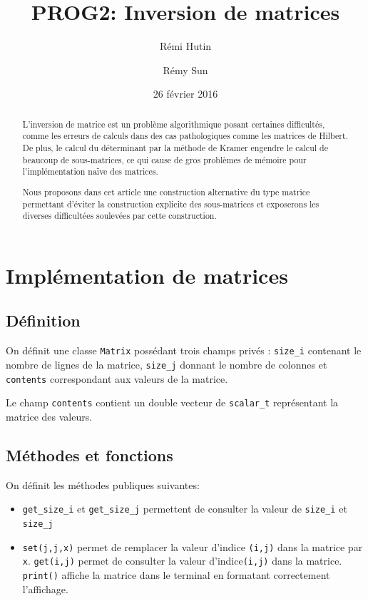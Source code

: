 \documentclass[a4paper,11pt]{article}
\title{PROG2: Inversion de matrices}
\author{Rémi Hutin \and Rémy Sun}
\date{26 février 2016}
\begin{document}
\maketitle

\begin{abstract}
  L'inversion de matrice est un problème algorithmique posant certaines difficultés, comme les erreurs de calculs dans des cas pathologiques comme les matrices de Hilbert.
  De plus, le calcul du déterminant par la méthode de Kramer engendre le calcul de beaucoup de sous-matrices, ce qui cause de gros problèmes de mémoire pour l'implémentation naïve des matrices.

  Nous proposons dans cet article une construction alternative du type matrice permettant d'éviter la construction explicite des sous-matrices et exposerons les diverses difficultées soulevées par cette construction.
\end{abstract}

\section{Implémentation de matrices}

\subsection{Définition}

On définit une classe \texttt{Matrix} possédant trois champs privés : \texttt{size\_i} contenant le nombre de lignes de la matrice, \texttt{size\_j} donnant le nombre de colonnes et
 \texttt{contents} correspondant aux valeurs de la matrice.

Le champ  \texttt{contents}  contient un double vecteur de \texttt{scalar\_t} représentant la matrice des valeurs.

\subsection{Méthodes et fonctions}

On définit les méthodes publiques suivantes:

\begin{itemize}
\item \texttt{get\_size\_i} et \texttt{get\_size\_j} permettent de consulter la valeur de \texttt{size\_i} et \texttt{size\_j}
\item \texttt{set(j,j,x)} permet de remplacer la valeur d'indice \texttt{(i,j)} dans la matrice par \texttt{x}. \texttt{get(i,j)} permet de consulter la valeur d'indice\texttt{(i,j)} dans la matrice. \texttt{print()} affiche la matrice dans le terminal en formatant correctement l'affichage.
\end{itemize}
\end{document}
